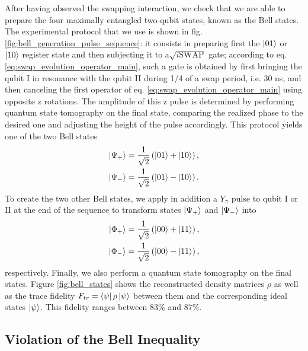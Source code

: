 After having observed the swapping interaction, we check that we are able to prepare the four maximally entangled two-qubit states, known as the Bell states. The experimental protocol that we use is shown in fig. \ref{fig:bell_generation_pulse_sequence}: it consists in preparing first the $\left| 01 \right>$ or $\left| 10 \right>$  register state and then subjecting it to a$\sqrt{i\mathrm{SWAP}}$ gate; according to eq. \ref{eq:swap_evolution_operator_main}, such a gate is obtained by first bringing the qubit I in resonance with the qubit II during 1/4 of a swap period, i.e. 30 ns, and then canceling the first operator of eq. \ref{eq:swap_evolution_operator_main} using opposite z rotations. The amplitude of this z pulse is determined by performing quantum state tomography on the final state, comparing the realized phase to the desired one and adjusting the height of the pulse accordingly. This protocol yields one of the two Bell states
%
\begin{eqnarray}
\left| \Psi_+ \right> = \frac{1}{\sqrt{2}}\left(\left| 01 \right>+\left| 10 \right>\right), \\
\left| \Psi_- \right> = \frac{1}{\sqrt{2}}\left(\left| 01 \right>-\left| 10 \right>\right).
\end{eqnarray}
%
To create the two other Bell states, we apply in addition a $Y_\pi$ pulse to qubit I or II at the end of the sequence to transform states $\left| \Psi_+ \right>$  and $\left| \Psi_- \right>$ into 
\begin{eqnarray}
\left| \Phi_+ \right> = \frac{1}{\sqrt{2}}\left(\left| 00 \right>+\left| 11 \right>\right), \\
\left| \Phi_- \right> = \frac{1}{\sqrt{2}}\left(\left| 00 \right>-\left| 11 \right>\right),
\end{eqnarray}
%
respectively. Finally, we also perform a quantum state tomography on the final states. Figure \ref{fig:bell_states} shows the reconstructed density matrices $\rho$ as well as the trace fidelity $F_{tr}=\left< \psi \right|\rho\left| \psi \right>$ between them and the corresponding ideal states $\left| \psi \right>$. This fidelity ranges between $83 \%$ and $87 \%$.

\subsection{Violation of the Bell Inequality} \label{section:bell_inequality}

